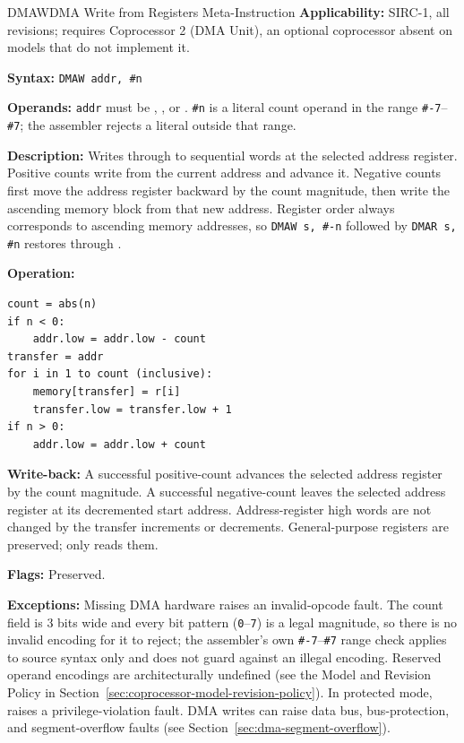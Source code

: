 \begin{instructionbox}{DMAW}{DMA Write from Registers Meta-Instruction}
	\textbf{Applicability:} SIRC-1, all revisions; requires Coprocessor 2 (DMA Unit), an optional coprocessor absent
	on models that do not implement it.

	\textbf{Syntax:} \texttt{DMAW addr, \#n}

	\textbf{Operands:} \texttt{addr} must be , , or . \texttt{\#n} is a literal count operand in the
	range \texttt{\#-7}--\texttt{\#7}; the assembler rejects a literal outside that range.

	\textbf{Description:} Writes  through  to sequential words at the selected address register. Positive
	counts write from the current address and advance it. Negative counts first move the address register backward by the
	count magnitude, then write the ascending memory block from that new address. Register order always corresponds to
	ascending memory addresses, so \texttt{DMAW s, \#-n} followed by \texttt{DMAR s, \#n} restores  through
	.

	\textbf{Operation:}
	\begin{verbatim}
count = abs(n)
if n < 0:
    addr.low = addr.low - count
transfer = addr
for i in 1 to count (inclusive):
    memory[transfer] = r[i]
    transfer.low = transfer.low + 1
if n > 0:
    addr.low = addr.low + count
\end{verbatim}

	\textbf{Write-back:} A successful positive-count  advances the selected address register by the count
	magnitude. A successful negative-count  leaves the selected address register at its decremented start
	address. Address-register high words are not changed by the transfer increments or decrements. General-purpose
	registers are preserved;  only reads them.

	\textbf{Flags:} Preserved.

	\textbf{Exceptions:} Missing DMA hardware raises an invalid-opcode fault. The count field is 3 bits wide and
	every bit pattern (\texttt{0}--\texttt{7}) is a legal magnitude, so there is no invalid encoding for it to
	reject; the assembler's own \texttt{\#-7}--\texttt{\#7} range check applies to source syntax only and does not
	guard against an illegal encoding. Reserved operand encodings are architecturally undefined (see the
	Model and Revision Policy in
	Section~\ref{sec:coprocessor-model-revision-policy}). In protected mode, raises a privilege-violation fault. DMA writes can raise
	data bus, bus-protection, and segment-overflow faults (see Section~\ref{sec:dma-segment-overflow}).


\end{instructionbox}
